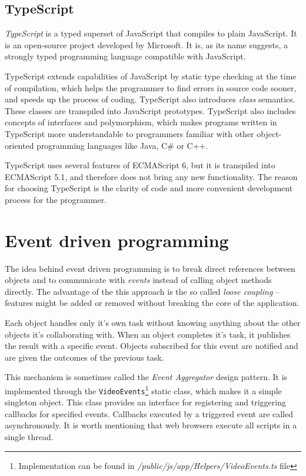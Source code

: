 \subsection{TypeScript}
\textit{TypeScript} is a typed superset of JavaScript that compiles to plain JavaScript\cite{typescript}. It is an open-source project developed by Microsoft. It is, as its name suggests, a strongly typed programming language compatible with JavaScript.

TypeScript extends capabilities of JavaScript by static type checking at the time of compilation, which helps the programmer to find errors in source code sooner, and speeds up the process of coding. TypeScript also introduces \textit{class} semantics. These classes are transpiled into JavaScript prototypes. TypeScript also includes concepts of interfaces and polymorphism, which makes programs written in TypeScript more understandable to programmers familiar with other object-oriented programming languages like Java, C\# or C++.

TypeScript uses several features of ECMAScript 6, but it is transpiled into ECMAScript 5.1, and therefore does not bring any new functionality. The reason for choosing TypeScript is the clarity of code and more convenient development process for the programmer.



\section{Event driven programming}
The idea behind event driven programming is to break direct references between objects and to communicate with \textit{events} instead of calling object methods directly. The advantage of the this approach is the so called \textit{loose coupling} \cite{loose_coupling} -- features might be added or removed without breaking the core of the application.

Each object handles only it's own task without knowing anything about the other objects it's collaborating with. When an object completes it's task, it publishes the result with a specific event. Objects subscribed for this event are notified and are given the outcomes of the previous task.

This mechanism is sometimes called the \textit{Event Aggregator} design pattern. It is implemented through the \verb|VideoEvents|\footnote{Implementation can be found in \textit{/public/js/app/Helpers/VideoEvents.ts} file} static class, which makes it a simple singleton object. This class provides an interface for registering and triggering callbacks for specified events. Callbacks executed by a triggered event are called asynchronously. It is worth mentioning that web browsers execute all scripts in a single thread.

